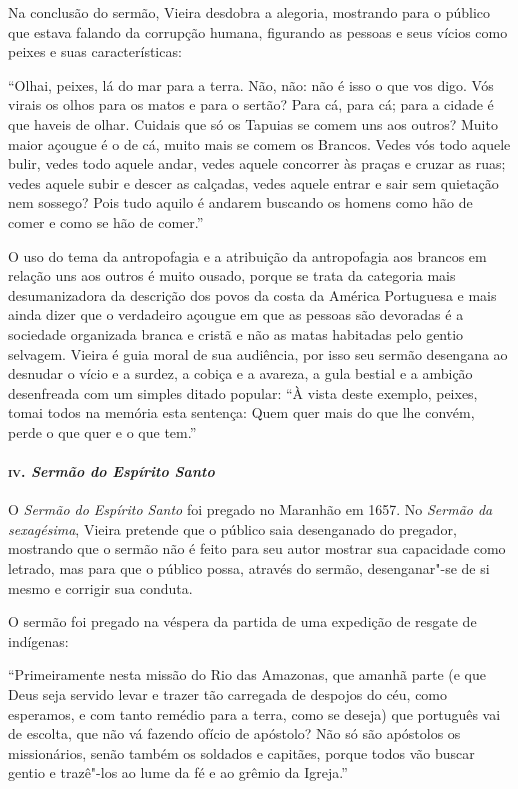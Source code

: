 Na conclusão do sermão, Vieira desdobra a alegoria, mostrando para o
público que estava falando da corrupção humana, figurando as pessoas e
seus vícios como peixes e suas características:

``Olhai, peixes, lá do mar para a terra. Não, não: não é isso o que vos
digo. Vós virais os olhos para os matos e para o sertão? Para cá, para
cá; para a cidade é que haveis de olhar. Cuidais que só os Tapuias se
comem uns aos outros? Muito maior açougue é o de cá, muito mais se comem
os Brancos. Vedes vós todo aquele bulir, vedes todo aquele andar, vedes
aquele concorrer às praças e cruzar as ruas; vedes aquele subir e descer
as calçadas, vedes aquele entrar e sair sem quietação nem sossego? Pois
tudo aquilo é andarem buscando os homens como hão de comer e como se hão
de comer.''

O uso do tema da antropofagia e a atribuição da antropofagia aos brancos
em relação uns aos outros é muito ousado, porque se trata da categoria
mais desumanizadora da descrição dos povos da costa da América
Portuguesa e mais ainda dizer que o verdadeiro açougue em que as pessoas
são devoradas é a sociedade organizada branca e cristã e não as matas
habitadas pelo gentio selvagem. Vieira é guia moral de sua audiência,
por isso seu sermão desengana ao desnudar o vício e a surdez, a cobiça e
a avareza, a gula bestial e a ambição desenfreada com um simples ditado
popular: ``À vista deste exemplo, peixes, tomai todos na memória esta
sentença: Quem quer mais do que lhe convém, perde o que quer e o que
tem.''

\paragraph{\textsc{iv}. \emph{Sermão do Espírito Santo}}

O \emph{Sermão do Espírito Santo} foi pregado no Maranhão em 1657. No
\emph{Sermão da sexagésima}, Vieira pretende que o público saia
desenganado do pregador, mostrando que o sermão não é feito para seu
autor mostrar sua capacidade como letrado, mas para que o público possa,
através do sermão, desenganar"-se de si mesmo e corrigir sua conduta.

O sermão foi pregado na véspera da partida de uma expedição de resgate
de indígenas:

``Primeiramente nesta missão do Rio das Amazonas, que amanhã parte (e
que Deus seja servido levar e trazer tão carregada de despojos do céu,
como esperamos, e com tanto remédio para a terra, como se deseja) que
português vai de escolta, que não vá fazendo ofício de apóstolo? Não só
são apóstolos os missionários, senão também os soldados e capitães,
porque todos vão buscar gentio e trazê"-los ao lume da fé e ao grêmio da
Igreja.''

